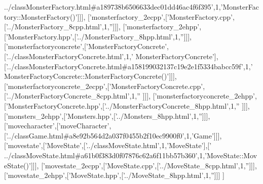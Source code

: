 \begin{DoxyCode}
{      ../classMonsterFactory.html#a189738b6506633dec01dd46ac4f6f395'},1,\textcolor{stringliteral}{'MonsterFactory::MonsterFactory()'}]]],
  [\textcolor{stringliteral}{'monsterfactory\_2ecpp'},[\textcolor{stringliteral}{'MonsterFactory.cpp'},[\textcolor{stringliteral}{'../MonsterFactory\_8cpp.html'},1,\textcolor{stringliteral}{''}]]],
  [\textcolor{stringliteral}{'monsterfactory\_2ehpp'},[\textcolor{stringliteral}{'MonsterFactory.hpp'},[\textcolor{stringliteral}{'../MonsterFactory\_8hpp.html'},1,\textcolor{stringliteral}{''}]]],
  [\textcolor{stringliteral}{'monsterfactoryconcrete'},[\textcolor{stringliteral}{'MonsterFactoryConcrete'},[\textcolor{stringliteral}{'../classMonsterFactoryConcrete.html'},1,\textcolor{stringliteral}{'
      MonsterFactoryConcrete'}],[\textcolor{stringliteral}{'../classMonsterFactoryConcrete.html#a158199032137c19e2e1f5334babcc59f'},1,\textcolor{stringliteral}{'
      MonsterFactoryConcrete::MonsterFactoryConcrete()'}]]],
  [\textcolor{stringliteral}{'monsterfactoryconcrete\_2ecpp'},[\textcolor{stringliteral}{'MonsterFactoryConcrete.cpp'},[\textcolor{stringliteral}{'../MonsterFactoryConcrete\_8cpp.html'},1,\textcolor{stringliteral}{''}
      ]]],
  [\textcolor{stringliteral}{'monsterfactoryconcrete\_2ehpp'},[\textcolor{stringliteral}{'MonsterFactoryConcrete.hpp'},[\textcolor{stringliteral}{'../MonsterFactoryConcrete\_8hpp.html'},1,\textcolor{stringliteral}{''}
      ]]],
  [\textcolor{stringliteral}{'monsters\_2ehpp'},[\textcolor{stringliteral}{'Monsters.hpp'},[\textcolor{stringliteral}{'../Monsters\_8hpp.html'},1,\textcolor{stringliteral}{''}]]],
  [\textcolor{stringliteral}{'movecharacter'},[\textcolor{stringliteral}{'moveCharacter'},[\textcolor{stringliteral}{'../classGame.html#a8e92b564d2a037f0455b2f10ec9900f0'},1,\textcolor{stringliteral}{'Game'}]]],
  [\textcolor{stringliteral}{'movestate'},[\textcolor{stringliteral}{'MoveState'},[\textcolor{stringliteral}{'../classMoveState.html'},1,\textcolor{stringliteral}{'MoveState'}],[\textcolor{stringliteral}{'
      ../classMoveState.html#a61b0f383d0f07876c62a6f11bb57b360'},1,\textcolor{stringliteral}{'MoveState::MoveState()'}]]],
  [\textcolor{stringliteral}{'movestate\_2ecpp'},[\textcolor{stringliteral}{'MoveState.cpp'},[\textcolor{stringliteral}{'../MoveState\_8cpp.html'},1,\textcolor{stringliteral}{''}]]],
  [\textcolor{stringliteral}{'movestate\_2ehpp'},[\textcolor{stringliteral}{'MoveState.hpp'},[\textcolor{stringliteral}{'../MoveState\_8hpp.html'},1,\textcolor{stringliteral}{''}]]]
]
\end{DoxyCode}
